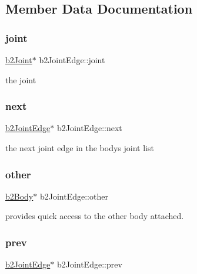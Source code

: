 \subsection{Member Data Documentation}
\mbox{\label{structb2_joint_edge_ab5bac5d495af1280c50271f56a221503}} 
\subsubsection{\texorpdfstring{joint}{joint}}
{\footnotesize\ttfamily \mbox{\hyperlink{classb2_joint}{b2\+Joint}}$\ast$ b2\+Joint\+Edge\+::joint}



the joint 

\mbox{\label{structb2_joint_edge_a3d17286bc697bb620ee151e4cd07438c}} 
\subsubsection{\texorpdfstring{next}{next}}
{\footnotesize\ttfamily \mbox{\hyperlink{structb2_joint_edge}{b2\+Joint\+Edge}}$\ast$ b2\+Joint\+Edge\+::next}



the next joint edge in the body\textquotesingle{}s joint list 

\mbox{\label{structb2_joint_edge_a64aef21fb91211871de8796baecccb95}} 
\subsubsection{\texorpdfstring{other}{other}}
{\footnotesize\ttfamily \mbox{\hyperlink{classb2_body}{b2\+Body}}$\ast$ b2\+Joint\+Edge\+::other}



provides quick access to the other body attached. 

\mbox{\label{structb2_joint_edge_acc3621e38d9664db2805e0fc29d71335}} 
\subsubsection{\texorpdfstring{prev}{prev}}
{\footnotesize\ttfamily \mbox{\hyperlink{structb2_joint_edge}{b2\+Joint\+Edge}}$\ast$ b2\+Joint\+Edge\+::prev}



